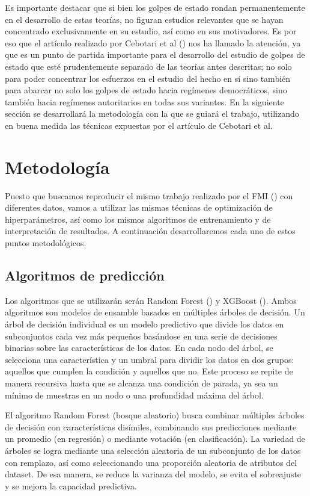 \documentclass{article}
\begin{document}
Es importante destacar que si bien los golpes de estado rondan permanentemente
en el desarrollo de estas teorías, no figuran estudios relevantes que se hayan concentrado
exclusivamente en su estudio, así como en sus motivadores. Es por eso que el artículo
realizado por Cebotari et al (\citeyear{Ceb24}) nos ha llamado la atención, ya que es un
punto de partida importante para el desarrollo del estudio de golpes de estado que esté
prudentemente separado de las teorías antes descritas; no solo para poder concentrar los
esfuerzos en el estudio del hecho en sí sino también para abarcar no solo los golpes de
estado hacia regímenes democráticos, sino también hacia regímenes autoritarios en todas
sus variantes. En la siguiente sección se desarrollará la metodología con la que se guiará
el trabajo, utilizando en buena medida las técnicas expuestas por el artículo de Cebotari
et al.

\section{Metodología}
Puesto que buscamos reproducir el mismo trabajo realizado por el FMI (\cite{Ceb24}) 
con diferentes datos, vamos a utilizar las mismas técnicas de optimización de 
hiperparámetros, así como los mismos algoritmos de entrenamiento y de interpretación 
de resultados. A continuación desarrollaremos cada uno de estos puntos metodológicos.

\subsection{Algoritmos de predicción}
Los algoritmos que se utilizarán serán Random Forest (\cite{Bre01}) y XGBoost
(\cite{Che16}). Ambos algoritmos son modelos de ensamble basados en múltiples 
árboles de decisión. Un árbol de decisión individual es un modelo predictivo que divide 
los datos en subconjuntos cada vez más pequeños basándose en una serie de decisiones 
binarias sobre las características de los datos. En cada nodo del árbol, se selecciona una 
característica y un umbral para dividir los datos en dos grupos: aquellos que cumplen 
la condición y aquellos que no. Este proceso se repite de manera recursiva hasta que se 
alcanza una condición de parada, ya sea un mínimo de muestras en un nodo o una 
profundidad máxima del árbol.

El algoritmo Random Forest (bosque aleatorio) busca combinar 
múltiples árboles de decisión con características disímiles, combinando sus predicciones
mediante un promedio (en regresión) o mediante votación (en clasificación). 
La variedad de árboles se logra mediante una selección aleatoria de un subconjunto de los 
datos con remplazo, así como seleccionando una proporción aleatoria
de atributos del dataset. De esa manera, se reduce la varianza del modelo, se evita el
sobreajuste y se mejora la capacidad predictiva.
\end{document}
